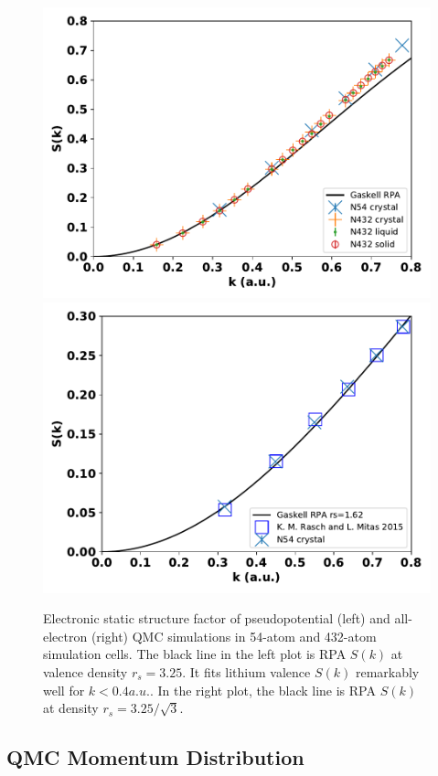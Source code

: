 \documentclass[aps,prl,superscriptaddress]{revtex4-1}
\begin{document}
\begin{figure}[h]
\includegraphics[scale=0.48]{figures/li40bg_dsk-bfd}
\includegraphics[scale=0.48]{figures/li40bg_dsk-fc}
\caption{Electronic static structure factor of pseudopotential (left) and all-electron (right) QMC simulations in 54-atom and 432-atom simulation cells. The black line in the left plot is RPA $S(k)$ at valence density $r_s=3.25$. It fits lithium valence $S(k)$ remarkably well for $k<0.4 a.u.$. In the right plot, the black line is RPA $S(k)$ at density $r_s=3.25/\sqrt{3}$. \label{fig:qmc-dsk}}
\end{figure}


\subsection{QMC Momentum Distribution}
\end{document}

